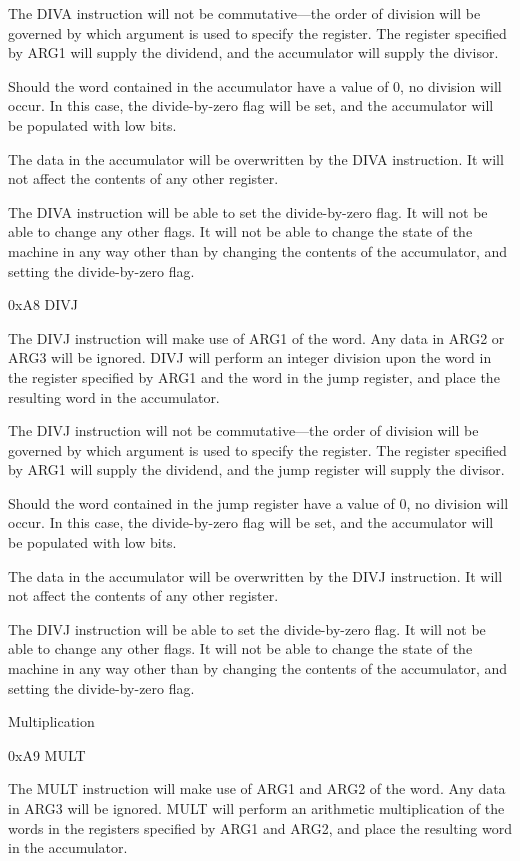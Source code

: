\documentclass[]{article}
\begin{document}
The DIVA instruction will not be commutative---the order of division
will be governed by which argument is used to specify the register. The
register specified by ARG1 will supply the dividend, and the accumulator
will supply the divisor.

Should the word contained in the accumulator have a value of 0, no
division will occur. In this case, the divide-by-zero flag will be set,
and the accumulator will be populated with low bits.~

The data in the accumulator will be overwritten by the DIVA instruction.
It will not affect the contents of any other register.

The DIVA instruction will be able to set the divide-by-zero flag. It
will not be able to change any other flags. It will not be able to
change the state of the machine in any way other than by changing the
contents of the accumulator, and setting the divide-by-zero flag.

0xA8 DIVJ

The DIVJ instruction will make use of ARG1 of the word. Any data in ARG2
or ARG3 will be ignored. DIVJ will perform an integer division upon the
word in the register specified by ARG1 and the word in the jump
register, and place the resulting word in the accumulator.

The DIVJ instruction will not be commutative---the order of division
will be governed by which argument is used to specify the register. The
register specified by ARG1 will supply the dividend, and the jump
register will supply the divisor.

Should the word contained in the jump register have a value of 0, no
division will occur. In this case, the divide-by-zero flag will be set,
and the accumulator will be populated with low bits.~

The data in the accumulator will be overwritten by the DIVJ instruction.
It will not affect the contents of any other register.

The DIVJ instruction will be able to set the divide-by-zero flag. It
will not be able to change any other flags. It will not be able to
change the state of the machine in any way other than by changing the
contents of the accumulator, and setting the divide-by-zero flag.

Multiplication

0xA9 MULT

The MULT instruction will make use of ARG1 and ARG2 of the word. Any
data in ARG3 will be ignored. MULT will perform an arithmetic
multiplication of the words in the registers specified by ARG1 and ARG2,
and place the resulting word in the accumulator.
\end{document}
